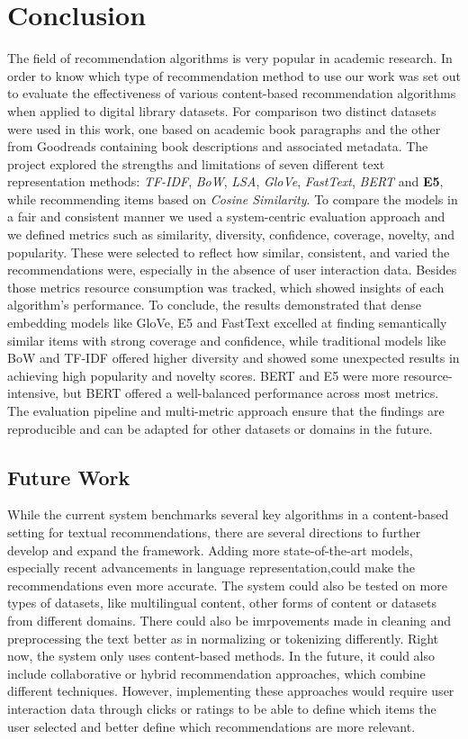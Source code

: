 \documentclass[\myFontSize,a4paper,oneside,hidelinks]{article}
\begin{document}
\clearpage{}
\section{Conclusion}
The field of recommendation algorithms is very popular in academic research. In order to know which type of recommendation method to use our work was set out to evaluate the effectiveness of various content-based recommendation algorithms when applied to digital library datasets.
For comparison two distinct datasets were used in this work, one based on academic book paragraphs and the other from Goodreads containing book descriptions and associated metadata. The project explored the strengths and limitations of seven different text representation methods: \textit{TF-IDF}, \textit{BoW}, \textit{LSA}, \textit{GloVe}, \textit{FastText}, \textit{BERT} and \textbf{E5}, while recommending items based on \textit{Cosine Similarity}.
%
To compare the models in a fair and consistent manner we used a system-centric evaluation approach and we defined metrics such as similarity, diversity, confidence, coverage, novelty, and popularity. These were selected to reflect how similar, consistent, and varied the recommendations were, especially in the absence of user interaction data. Besides those metrics resource consumption was tracked, which showed insights of each algorithm’s performance.
%
To conclude, the results demonstrated that dense embedding models like GloVe, E5 and FastText excelled at finding semantically similar items with strong coverage and confidence, while traditional models like BoW and TF-IDF offered higher diversity and showed some unexpected results in achieving high popularity and novelty scores. BERT and E5 were more resource-intensive, but BERT offered a well-balanced performance across most metrics.
The evaluation pipeline and multi-metric approach ensure that the findings are reproducible and can be adapted for other datasets or domains in the future.



\subsection{Future Work}

While the current system benchmarks several key algorithms in a content-based setting for textual recommendations, there are several directions to further develop and expand the framework.
%
Adding more state-of-the-art models, especially recent advancements in language representation,could make the recommendations even more accurate. The system could also be tested on more types of datasets, like multilingual content, other forms of content or datasets from different domains. There could also be imrpovements made in cleaning and preprocessing the text better as in normalizing or tokenizing differently.
%
Right now, the system only uses content-based methods. In the future, it could also include collaborative or hybrid recommendation approaches, which combine different techniques. However, implementing these approaches would require user interaction data through clicks or ratings to be able to define which items the user selected and better define which recommendations are more relevant.
\end{document}
